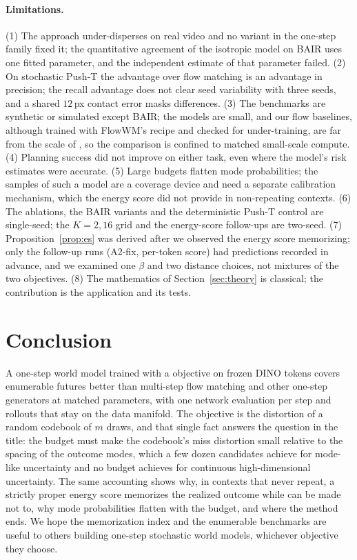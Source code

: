 \paragraph{Limitations.}
(1) The approach under-disperses on real video and no variant in the one-step family fixed it; the quantitative agreement of the isotropic model on BAIR uses one fitted parameter, and the independent estimate of that parameter failed. (2) On stochastic Push-T the advantage over flow matching is an advantage in precision; the recall advantage does not clear seed variability with three seeds, and a shared $12$\,px contact error masks differences. (3) The benchmarks are synthetic or simulated except BAIR; the models are small, and our flow baselines, although trained with FlowWM's recipe and checked for under-training, are far from the scale of \citet{porcher2026flowwm}, so the comparison is confined to matched small-scale compute. (4) Planning success did not improve on either task, even where the model's risk estimates were accurate. (5) Large budgets flatten mode probabilities; the samples of such a model are a coverage device and need a separate calibration mechanism, which the energy score did not provide in non-repeating contexts. (6) The ablations, the BAIR variants and the deterministic Push-T control are single-seed; the $K{=}2,16$ grid and the energy-score follow-ups are two-seed. (7) Proposition~\ref{prop:es} was derived after we observed the energy score memorizing; only the follow-up runs (A2-fix, per-token score) had predictions recorded in advance, and we examined one $\beta$ and two distance choices, not mixtures of the two objectives. (8) The mathematics of Section~\ref{sec:theory} is classical; the contribution is the application and its tests.

\section{Conclusion}
\label{sec:conclusion}
A one-step world model trained with a \nom{} objective on frozen DINO tokens covers enumerable futures better than multi-step flow matching and other one-step generators at matched parameters, with one network evaluation per step and rollouts that stay on the data manifold. The objective is the distortion of a random codebook of $m$ draws, and that single fact answers the question in the title: the budget must make the codebook's miss distortion small relative to the spacing of the outcome modes, which a few dozen candidates achieve for mode-like uncertainty and no budget achieves for continuous high-dimensional uncertainty. The same accounting shows why, in contexts that never repeat, a strictly proper energy score memorizes the realized outcome while \nom{} can be made not to, why mode probabilities flatten with the budget, and where the method ends. We hope the memorization index and the enumerable benchmarks are useful to others building one-step stochastic world models, whichever objective they choose.
